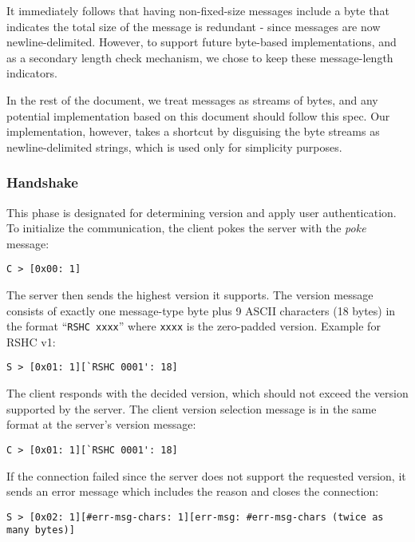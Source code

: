 It immediately follows that having non-fixed-size messages include a byte that indicates the total size of the message is redundant - since messages are now newline-delimited. However, to support future byte-based implementations, and as a secondary length check mechanism, we chose to keep these message-length indicators.

In the rest of the document, we treat messages as streams of bytes, and any potential implementation based on this document should follow this spec. Our implementation, however, takes a shortcut by disguising the byte streams as newline-delimited strings, which is used only for simplicity purposes.

\subsubsection{Handshake}
\label{sec:pdus:pdu:hs}

This phase is designated for determining version and apply user authentication. To initialize the communication, the client pokes the server with the {\em poke} message:

\begin{verbatim}
C > [0x00: 1]
\end{verbatim}

The server then sends the highest version it supports. The version message consists of exactly one message-type byte plus 9 ASCII characters (18 bytes) in the format ``{\tt RSHC xxxx}'' where {\tt xxxx} is the zero-padded version. Example for RSHC v1:

\begin{verbatim}
S > [0x01: 1][`RSHC 0001': 18]
\end{verbatim}

The client responds with the decided version, which should not exceed the version supported by the server. The client version selection message is in the same format at the server's version message:

\begin{verbatim}
C > [0x01: 1][`RSHC 0001': 18]
\end{verbatim}

\noindent
If the connection failed since the server does not support the requested version, it sends an error message which includes the reason and closes the connection:

\begin{verbatim}
S > [0x02: 1][#err-msg-chars: 1][err-msg: #err-msg-chars (twice as many bytes)]
\end{verbatim}

